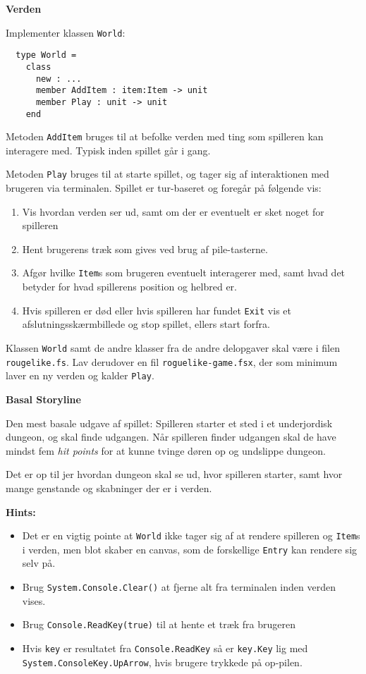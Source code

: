 \textbf{Verden}

Implementer klassen \lstinline{World}:

\begin{lstlisting}
  type World =
    class
      new : ...
      member AddItem : item:Item -> unit
      member Play : unit -> unit
    end
\end{lstlisting}

Metoden \lstinline{AddItem} bruges til at befolke verden med ting som spilleren
kan interagere med. Typisk inden spillet går i gang.

Metoden \lstinline{Play} bruges til at starte spillet, og tager sig af
interaktionen med brugeren via terminalen. Spillet er tur-baseret og
foregår på følgende vis:
\begin{enumerate}
\item Vis hvordan verden ser ud, samt om der er eventuelt er sket
  noget for spilleren
\item Hent brugerens træk som gives ved brug af pile-tasterne.
\item Afgør hvilke \lstinline{Item}s som brugeren eventuelt interagerer med,
  samt hvad det betyder for hvad spillerens position og helbred er.
\item Hvis spilleren er død eller hvis spilleren har fundet
  \lstinline{Exit} vis et afslutningsskærmbillede og stop
  spillet, ellers start forfra.
\end{enumerate}

Klassen \lstinline{World} samt de andre klasser fra de andre
delopgaver skal være i filen \texttt{rougelike.fs}. Lav derudover en
fil \texttt{roguelike-game.fsx}, der som minimum laver en ny verden og
kalder \lstinline{Play}.


\textbf{Basal Storyline}

Den mest basale udgave af spillet: Spilleren starter et sted i et
underjordisk dungeon, og skal finde udgangen. Når spilleren finder
udgangen skal de have mindst fem \emph{hit points} for at kunne tvinge
døren op og undslippe dungeon.

Det er op til jer hvordan dungeon skal se ud, hvor spilleren starter,
samt hvor mange genstande og skabninger der er i verden.


\textbf{Hints:}
\begin{itemize}
\item Det er en vigtig pointe at \lstinline{World} ikke tager sig af
  at rendere spilleren og \lstinline{Item}s i verden, men blot skaber
  en canvas, som de forskellige \lstinline{Entry} kan rendere sig selv
  på.
\item Brug \lstinline{System.Console.Clear()} at fjerne alt fra terminalen inden
  verden vises.
\item Brug \lstinline{Console.ReadKey(true)} til at hente et træk fra brugeren
\item Hvis \lstinline{key} er resultatet fra \lstinline{Console.ReadKey} så er \lstinline{key.Key}
  lig med \lstinline{System.ConsoleKey.UpArrow}, hvis brugere trykkede på
  op-pilen.
\end{itemize}





